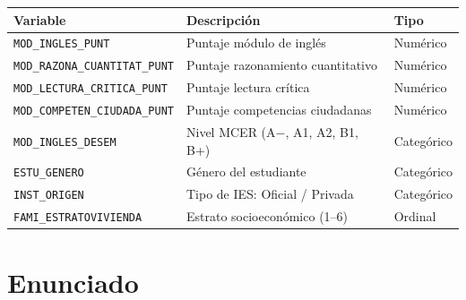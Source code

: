\documentclass[11pt, a4paper]{article}
\begin{document}
\vspace{4pt}
\begin{tabular}{l l l}
\toprule
\textbf{Variable} & \textbf{Descripci\'on} & \textbf{Tipo} \\
\midrule
\texttt{MOD\_INGLES\_PUNT}           & Puntaje m\'odulo de ingl\'es        & Num\'erico \\
\texttt{MOD\_RAZONA\_CUANTITAT\_PUNT} & Puntaje razonamiento cuantitativo  & Num\'erico \\
\texttt{MOD\_LECTURA\_CRITICA\_PUNT}  & Puntaje lectura cr\'itica           & Num\'erico \\
\texttt{MOD\_COMPETEN\_CIUDADA\_PUNT} & Puntaje competencias ciudadanas    & Num\'erico \\
\texttt{MOD\_INGLES\_DESEM}           & Nivel MCER (A$-$, A1, A2, B1, B+) & Categ\'orico \\
\texttt{ESTU\_GENERO}                & G\'enero del estudiante              & Categ\'orico \\
\texttt{INST\_ORIGEN}                & Tipo de IES: Oficial / Privada     & Categ\'orico \\
\texttt{FAMI\_ESTRATOVIVIENDA}       & Estrato socioecon\'omico (1--6)     & Ordinal \\
\bottomrule
\end{tabular}

\section*{Enunciado}
\end{document}
